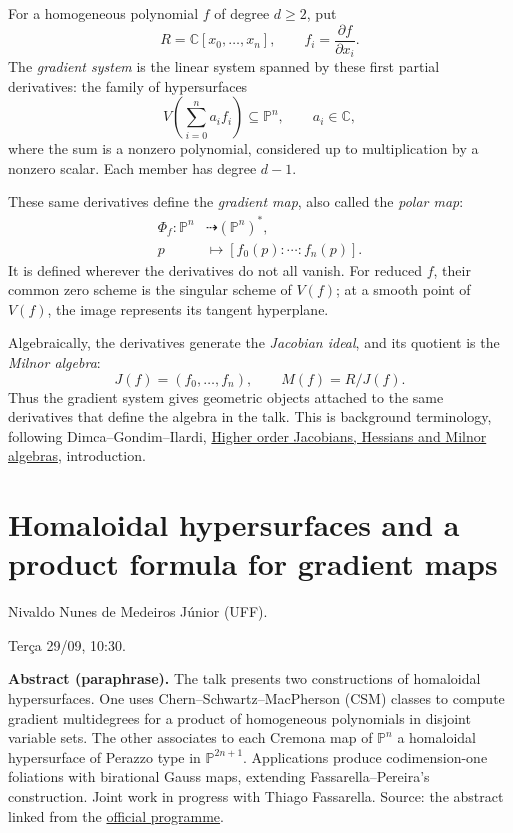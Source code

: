 \begin{remark}
\label{remark-ai-gradient-system}
For a homogeneous polynomial $f$ of
degree $d\geq2$, put
$$
R=\mathbb{C}[x_0,\ldots,x_n],
\qquad f_i=\frac{\partial f}{\partial x_i}.
$$
The \emph{gradient system} is the linear
system spanned by these first partial
derivatives: the family of hypersurfaces
$$
V\left(\sum_{i=0}^n a_i f_i\right)
\subseteq\mathbb{P}^n,
\qquad a_i\in\mathbb{C},
$$
where the sum is a nonzero polynomial,
considered up to multiplication by a
nonzero scalar. Each member has degree
$d-1$.

These same derivatives define the
\emph{gradient map}, also called the
\emph{polar map}:
$$
\begin{aligned}
\Phi_f:\mathbb{P}^n
&\dashrightarrow(\mathbb{P}^n)^*,\\
p&\longmapsto[f_0(p):\cdots:f_n(p)].
\end{aligned}
$$
It is defined wherever the derivatives
do not all vanish. For reduced $f$,
their common zero scheme is the singular
scheme of $V(f)$; at a smooth point of
$V(f)$, the image represents its tangent
hyperplane.

Algebraically, the derivatives generate
the \emph{Jacobian ideal}, and its
quotient is the \emph{Milnor algebra}:
$$
J(f)=(f_0,\ldots,f_n),
\qquad M(f)=R/J(f).
$$
Thus the gradient system gives geometric
objects attached to the same derivatives
that define the algebra in the talk.
This is background terminology, following
Dimca--Gondim--Ilardi,
\href{https://arxiv.org/abs/1902.09146}
{Higher order Jacobians, Hessians and
Milnor algebras}, introduction.
\end{remark}

\section{Homaloidal hypersurfaces and a
product
formula for gradient maps}
\label{section-nivaldo-junior}

Nivaldo Nunes de Medeiros Júnior (UFF).

Terça 29/09, 10:30.

\medskip\noindent
\textbf{Abstract (paraphrase).}
The talk presents two constructions of
homaloidal hypersurfaces. One uses
Chern--Schwartz--MacPherson (CSM) classes
to compute gradient multidegrees
for a product of homogeneous polynomials
in disjoint variable sets. The other
associates to each Cremona map of
$\mathbb{P}^n$ a homaloidal hypersurface
of Perazzo type in $\mathbb{P}^{2n+1}$.
Applications produce codimension-one
foliations with birational Gauss maps,
extending Fassarella--Pereira's
construction. Joint work in progress with
Thiago Fassarella.
Source: the abstract linked from the
\href{%
https://jornadaslp.github.io/%
jornadas-lp/programacao.html%
}{official programme}.

